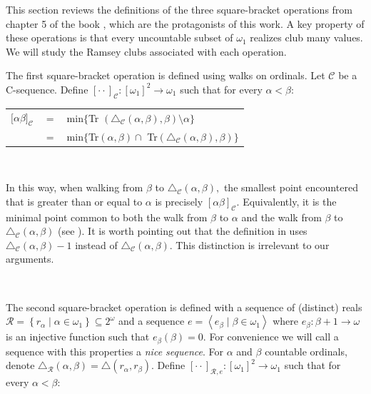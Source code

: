 \documentclass{article}
\begin{document}
This section reviews the definitions of the three square-bracket operations
from chapter 5 of the book \cite{Walks}, which are the protagonists of this
work. A key property of these operations is that every uncountable subset of
$\omega_{1}$ realizes club many values. We will study the Ramsey clubs
associated with each operation.

\qquad\qquad\qquad\qquad

The first square-bracket operation is defined using walks on ordinals. Let
$\mathcal{C}$ be a \textsf{C}-sequence. Define $[\cdot\cdot]_{\mathcal{C}%
}:\left[  \omega_{1}\right]  ^{2}\longrightarrow\omega_{1}$ such that for
every $\alpha<\beta$:

\begin{center}%
\begin{tabular}
[c]{|lll|}\hline
$\lbrack\alpha\beta]_{\mathcal{C}}$ & $=$ & \textsf{min}$\{$\textsf{Tr}%
$(\triangle_{\mathcal{C}}\left(  \alpha,\beta\right)  ,\beta)\setminus
\alpha\}$\\
& $=$ & \textsf{min}$\{$\textsf{Tr}$\left(  \alpha,\beta\right)  \cap$
\textsf{Tr}$(\triangle_{\mathcal{C}}\left(  \alpha,\beta\right)  ,\beta
)\}$\\\hline
\end{tabular}

\end{center}

\qquad\ \ \ \qquad\ \ \ 

In this way, when walking from $\beta$ to $\triangle_{\mathcal{C}}\left(
\alpha,\beta\right)  ,$ the smallest point encountered that is greater than or
equal to $\alpha$ is precisely $[\alpha\beta]_{\mathcal{C}}.$ Equivalently, it
is the minimal point common to both the walk from $\beta$ to $\alpha$ and the
walk from $\beta$ to $\triangle_{\mathcal{C}}\left(  \alpha,\beta\right)  $
(see \cite{Walks}). It is worth pointing out that the definition in
\cite{Walks} uses $\triangle_{\mathcal{C}}\left(  \alpha,\beta\right)  -1$
instead of $\triangle_{\mathcal{C}}\left(  \alpha,\beta\right)  .$ This
distinction is irrelevant to our arguments.

\qquad\qquad\qquad\ \ \ \ \ \ \qquad\qquad\ \ \ 

The second square-bracket operation is defined with a sequence of (distinct)
reals $\mathcal{R}=\left\{  r_{\alpha}\mid\alpha\in\omega_{1}\right\}
\subseteq2^{\omega}$ and a sequence $e=\left\langle e_{\beta}\mid\beta
\in\omega_{1}\right\rangle $ where $e_{\beta}:\beta+1\longrightarrow\omega$ is
an injective function such that $e_{\beta}\left(  \beta\right)  =0.$ For
convenience we will call a sequence with this properties a \emph{nice
sequence}. For $\alpha$ and $\beta$ countable ordinals, denote $\triangle
_{\mathcal{R}}\left(  \alpha,\beta\right)  =\triangle\left(  r_{\alpha
},r_{\beta}\right)  .$ Define $[\cdot\cdot]_{\mathcal{R},e}:\left[  \omega
_{1}\right]  ^{2}\longrightarrow\omega_{1}$ such that for every $\alpha<\beta$:
\end{document}
